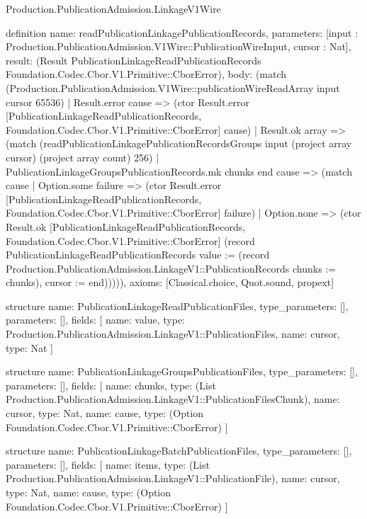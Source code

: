 \begin{lexlean}{Production.PublicationAdmission.LinkageV1Wire}
\begin{semanticmodule}
definition{
  name: readPublicationLinkagePublicationRecords,
  parameters: [input : Production.PublicationAdmission.V1Wire::PublicationWireInput, cursor : Nat],
  result: (Result PublicationLinkageReadPublicationRecords Foundation.Codec.Cbor.V1.Primitive::CborError),
  body: (match (Production.PublicationAdmission.V1Wire::publicationWireReadArray input cursor 65536)
    | Result.error cause => (ctor Result.error [PublicationLinkageReadPublicationRecords, Foundation.Codec.Cbor.V1.Primitive::CborError] cause)
    | Result.ok array => (match (readPublicationLinkagePublicationRecordsGroups input (project array cursor) (project array count) 256)
      | PublicationLinkageGroupsPublicationRecords.mk chunks end cause => (match cause
        | Option.some failure => (ctor Result.error [PublicationLinkageReadPublicationRecords, Foundation.Codec.Cbor.V1.Primitive::CborError] failure)
        | Option.none => (ctor Result.ok [PublicationLinkageReadPublicationRecords, Foundation.Codec.Cbor.V1.Primitive::CborError] (record PublicationLinkageReadPublicationRecords {value := (record Production.PublicationAdmission.LinkageV1::PublicationRecords {chunks := chunks}), cursor := end}))))),
  axioms: [Classical.choice, Quot.sound, propext]
}

structure{
  name: PublicationLinkageReadPublicationFiles,
  type_parameters: [],
  parameters: [],
  fields: [
    {name: value, type: Production.PublicationAdmission.LinkageV1::PublicationFiles},
    {name: cursor, type: Nat}
  ]
}

structure{
  name: PublicationLinkageGroupsPublicationFiles,
  type_parameters: [],
  parameters: [],
  fields: [
    {name: chunks, type: (List Production.PublicationAdmission.LinkageV1::PublicationFilesChunk)},
    {name: cursor, type: Nat},
    {name: cause, type: (Option Foundation.Codec.Cbor.V1.Primitive::CborError)}
  ]
}

structure{
  name: PublicationLinkageBatchPublicationFiles,
  type_parameters: [],
  parameters: [],
  fields: [
    {name: items, type: (List Production.PublicationAdmission.LinkageV1::PublicationFile)},
    {name: cursor, type: Nat},
    {name: cause, type: (Option Foundation.Codec.Cbor.V1.Primitive::CborError)}
  ]
}


\end{semanticmodule}
\end{lexlean}

